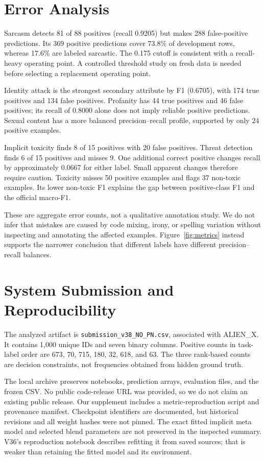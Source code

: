 \documentclass[10pt,a4paper]{article}
\begin{document}
\section{Error Analysis}
Sarcasm detects 81 of 88 positives (recall 0.9205) but makes 288 false-positive predictions. Its 369 positive predictions cover 73.8\% of development rows, whereas 17.6\% are labeled sarcastic. The 0.175 cutoff is consistent with a recall-heavy operating point. A controlled threshold study on fresh data is needed before selecting a replacement operating point.

Identity attack is the strongest secondary attribute by F1 (0.6705), with 174 true positives and 134 false positives. Profanity has 44 true positives and 46 false positives; its recall of 0.8000 alone does not imply reliable positive predictions. Sexual content has a more balanced precision--recall profile, supported by only 24 positive examples.

Implicit toxicity finds 8 of 15 positives with 20 false positives. Threat detection finds 6 of 15 positives and misses 9. One additional correct positive changes recall by approximately 0.0667 for either label. Small apparent changes therefore require caution. Toxicity misses 50 positive examples and flags 37 non-toxic examples. Its lower non-toxic F1 explains the gap between positive-class F1 and the official macro-F1.

These are aggregate error counts, not a qualitative annotation study. We do not infer that mistakes are caused by code mixing, irony, or spelling variation without inspecting and annotating the affected examples. Figure~\ref{fig:metrics} instead supports the narrower conclusion that different labels have different precision--recall balances.

\section{System Submission and Reproducibility}
The analyzed artifact is \texttt{submission\_v38\_NO\_PN.csv}, associated with ALIEN\_X. It contains 1,000 unique IDs and seven binary columns. Positive counts in task-label order are 673, 70, 715, 180, 32, 618, and 63. The three rank-based counts are decision constraints, not frequencies obtained from hidden ground truth.

The local archive preserves notebooks, prediction arrays, evaluation files, and the frozen CSV. No public code-release URL was provided, so we do not claim an existing public release. Our supplement includes a metric-reproduction script and provenance manifest. Checkpoint identifiers are documented, but historical revisions and all weight hashes were not pinned. The exact fitted implicit meta model and selected blend parameters are not preserved in the inspected summary. V36's reproduction notebook describes refitting it from saved sources; that is weaker than retaining the fitted model and its environment.
\end{document}
